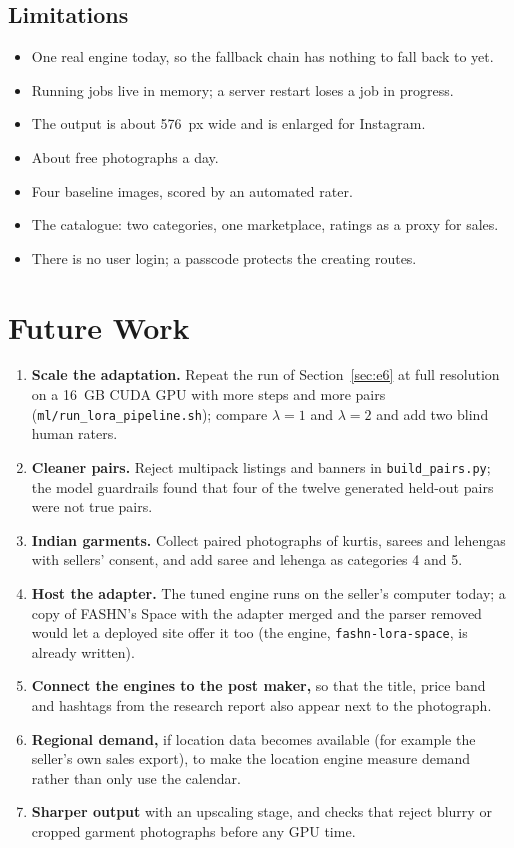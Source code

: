 \subsection{Limitations}
\begin{itemize}
\item One real engine today, so the fallback chain has nothing to fall back to yet.
\item Running jobs live in memory; a server restart loses a job in progress.
\item The output is about 576~px wide and is enlarged for Instagram.
\item About \vRunsLimit{} free photographs a day.
\item Four baseline images, scored by an automated rater.
\item The catalogue: two categories, one marketplace, ratings as a proxy for sales.
\item There is no user login; a passcode protects the creating routes.
\end{itemize}

\section{Future Work}

\begin{enumerate}
\item \textbf{Scale the adaptation.} Repeat the run of Section~\ref{sec:e6} at full resolution on a 16~GB CUDA GPU with more steps and more pairs (\texttt{ml/run\_lora\_pipeline.sh}); compare $\lambda = 1$ and $\lambda = 2$ and add two blind human raters.
\item \textbf{Cleaner pairs.} Reject multipack listings and banners in \texttt{build\_pairs.py}; the model guardrails found that four of the twelve generated held-out pairs were not true pairs.
\item \textbf{Indian garments.} Collect paired photographs of kurtis, sarees and lehengas with sellers' consent, and add saree and lehenga as categories 4 and 5.
\item \textbf{Host the adapter.} The tuned engine runs on the seller's computer today; a copy of FASHN's Space with the adapter merged and the parser removed would let a deployed site offer it too (the engine, \texttt{fashn-lora-space}, is already written).
\item \textbf{Connect the engines to the post maker,} so that the title, price band and hashtags from the research report also appear next to the photograph.
\item \textbf{Regional demand,} if location data becomes available (for example the seller's own sales export), to make the location engine measure demand rather than only use the calendar.
\item \textbf{Sharper output} with an upscaling stage, and checks that reject blurry or cropped garment photographs before any GPU time.
\end{enumerate}

